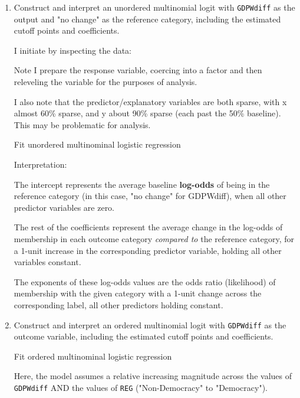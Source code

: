 \documentclass[12pt,letterpaper]{article}
\begin{document}
\begin{enumerate}
	\item Construct and interpret an unordered multinomial logit with \texttt{GDPWdiff} as the output and "no change" as the reference category, including the estimated cutoff points and coefficients.
	
		\noindent I initiate by inspecting the data:
	
	
	
	\noindent Note I prepare the response variable, coercing into a factor and then releveling the variable for the purposes of analysis.
	
	
	
	\noindent I also note that the predictor/explanatory variables are both sparse, with x almost 60\% sparse, and y about 90\% sparse (each past the 50\% baseline). This may be problematic for analysis.
		
	
	
	\noindent Fit unordered multinominal logistic regression

	
	
	\noindent Interpretation:
	
	\noindent The intercept represents the average baseline \textbf{log-odds} of being in the reference category (in this case, "no change" for GDPWdiff), when all other predictor variables are zero.
	
	\noindent The rest of the coefficients represent the average change in the log-odds of membership in each outcome category \textit{compared to} the reference category, for a 1-unit increase in the corresponding predictor variable, holding all other variables constant.
	
	\noindent The exponents of these log-odds values are the odds ratio (likelihood) of membership with the given category with a 1-unit change across the corresponding label, all other predictors holding constant.
	
	\item Construct and interpret an ordered multinomial logit with \texttt{GDPWdiff} as the outcome variable, including the estimated cutoff points and coefficients.

	\noindent Fit ordered multinominal logistic regression
	
	\noindent Here, the model assumes a relative increasing magnitude across the values of \texttt{GDPWdiff} AND the values of \texttt{REG} ("Non-Democracy" to "Democracy").

	
	
\end{enumerate}
\end{document}
